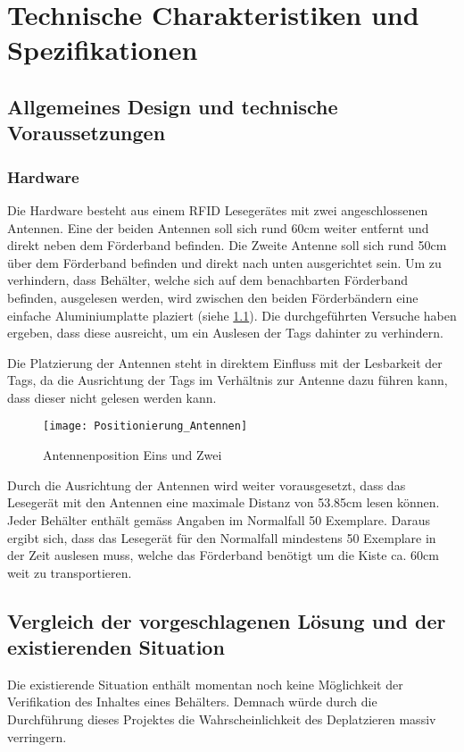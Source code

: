 \chapter{Technische Charakteristiken und Spezifikationen}

\section{Allgemeines Design und technische Voraussetzungen}
\subsection{Hardware}
Die Hardware besteht aus einem RFID Lesegerätes mit zwei angeschlossenen Antennen. Eine der beiden Antennen soll sich rund 60cm weiter entfernt und direkt neben dem Förderband befinden. Die Zweite Antenne soll sich rund 50cm über dem Förderband befinden und direkt nach unten ausgerichtet sein. Um zu verhindern, dass Behälter, welche sich auf dem benachbarten Förderband befinden, ausgelesen werden, wird zwischen den beiden Förderbändern eine einfache Aluminiumplatte plaziert (siehe \ref{fig:positionAntennen}). Die durchgeführten Versuche haben ergeben, dass diese ausreicht, um ein Auslesen der Tags dahinter zu verhindern.

Die Platzierung der Antennen steht in direktem Einfluss mit der Lesbarkeit der Tags, da die Ausrichtung der Tags im Verhältnis zur Antenne dazu führen kann, dass dieser nicht gelesen werden kann.

\begin{figure}
	\centering
	\texttt{[image: Positionierung\_Antennen]}
	\caption{Antennenposition Eins und Zwei}
	\label{fig:positionAntennen}
\end{figure}


Durch die Ausrichtung der Antennen wird weiter vorausgesetzt, dass das Lesegerät mit den Antennen eine maximale Distanz von 53.85cm lesen können. Jeder Behälter enthält gemäss Angaben im Normalfall 50 Exemplare. Daraus ergibt sich, dass das Lesegerät für den Normalfall mindestens 50 Exemplare in der Zeit auslesen muss, welche das Förderband benötigt um die Kiste ca. 60cm weit zu transportieren.

\section{Vergleich der vorgeschlagenen Lösung und der existierenden Situation}
Die existierende Situation enthält momentan noch keine Möglichkeit der Verifikation des Inhaltes eines Behälters. Demnach würde durch die Durchführung dieses Projektes die Wahrscheinlichkeit des Deplatzieren massiv verringern.

